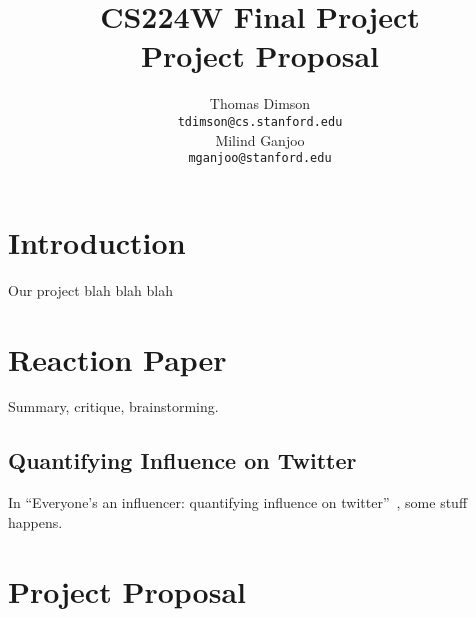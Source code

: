 \documentclass[11pt]{article}
\title{{\small CS224W Final Project} \\ Project Proposal}
\author{Thomas Dimson \\
  {\tt tdimson@cs.stanford.edu}
  \\\And
  Milind Ganjoo \\
  {\tt mganjoo@stanford.edu}
}
\date{}
\newcommand{\titlecite}[2]{``#1''~\cite{#2}}
\begin{document}
\maketitle

\section{Introduction}
Our project blah blah blah

\section{Reaction Paper}
Summary, critique, brainstorming.


\subsection{Quantifying Influence on Twitter}
In \titlecite{Everyone's an influencer: quantifying influence on twitter}{bakshy2011everyone}, 
some stuff happens.



\section{Project Proposal}
{} 
\end{document}
